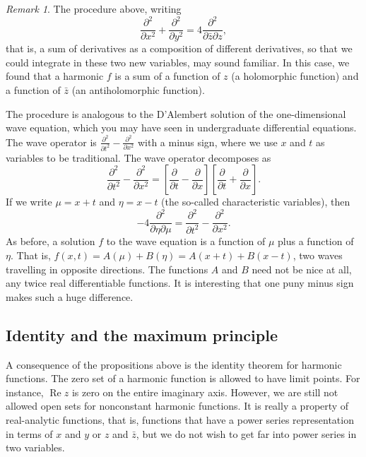 \documentclass[12pt,openany]{book}
\renewcommand{\Re}{\operatorname{Re}}
\theoremstyle{plain}
\theoremstyle{remark}
\newtheorem{remark}[thm]{Remark}
\theoremstyle{definition}
\theoremstyle{exercise}
\theoremstyle{example}
\begin{document}
\begin{remark}
The procedure above, writing
\begin{equation*}
\frac{\partial^2}{\partial x^2}+ \frac{\partial^2}{\partial y^2} = 
4 \frac{\partial^2}{\partial \bar{z} \partial z} ,
\end{equation*}
that is, a sum of derivatives as a composition of
different derivatives,
so that we could integrate in these two new variables, may
sound familiar.  In this case, we found that a harmonic $f$ is a sum of a function
of $z$ (a holomorphic function) and a function of $\bar{z}$ (an
antiholomorphic function).

The procedure is analogous to the D'Alembert solution of the one-dimensional
wave equation, which you may have seen in undergraduate differential equations.
The wave operator is
$\frac{\partial^2}{\partial t^2}- \frac{\partial^2}{\partial x^2}$ with a
minus sign, where we use $x$ and $t$ as variables to be traditional.
The wave operator decomposes as
\begin{equation*}
\frac{\partial^2}{\partial t^2}- \frac{\partial^2}{\partial x^2}
=
\left[ \frac{\partial}{\partial t}- \frac{\partial}{\partial x}
\right]
\left[ \frac{\partial}{\partial t}+ \frac{\partial}{\partial x}
\right] .
\end{equation*}
If we write $\mu = x+t$ and $\eta = x-t$ (the so-called characteristic
variables), then
\begin{equation*}
-4 \frac{\partial^2}{\partial \eta \partial \mu} = 
\frac{\partial^2}{\partial t^2}- \frac{\partial^2}{\partial x^2} .
\end{equation*}
As before, a solution $f$ to the wave equation is a function
of $\mu$ plus a function of $\eta$.  That is, $f(x,t) = A(\mu) + B(\eta) =
A(x+t)+B(x-t)$, two waves travelling in opposite directions.  The
functions $A$ and $B$ need not be nice at all, any twice real differentiable
functions.
It is interesting that one puny minus sign makes such a huge difference.
\end{remark}

\subsection{Identity and the maximum principle}

A consequence of the propositions above is the identity theorem
for harmonic functions.
The zero set of a harmonic function is allowed to have limit points.
For instance, $\Re z$ is zero on the entire imaginary
axis.  However, we are still not allowed open sets for nonconstant harmonic
functions.  It is really a property of real-analytic functions, that is,
functions that have a power series representation in terms of $x$ and $y$
or $z$ and $\bar{z}$, but we do not wish to get far into power series in two
variables.
\end{document}

